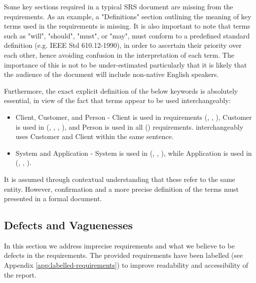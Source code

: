 Some key sections required in a typical SRS document are missing from the requirements.  As an example, a "Definitions" section outlining the meaning of key terms used in the requirements is missing.  It is also important to note that terms such as "will", "should", "must", or "may", must conform to a predefined standard definition (e.g. IEEE Std 610.12-1990), in order to ascertain their priority over each other, hence avoiding confusion in the interpretation of each term. The importance of this is not to be under-estimated particularly that it is likely that the audience of the document will include non-native English speakers.
\par
Furthermore, the exact explicit definition of the below keywords is absolutely essential, in view of the fact that terms appear to be used interchangeably:
\begin{itemize}
    \item Client, Customer, and Person - Client is used in requirements (\ROne, \RTwo, \RFive), Customer is used in (\RTwo, \RThree, \RFour, \RFive), and Person is used in all (\REight) requirements. \RFive \space interchangeably uses Customer and Client within the same sentence. 
    \item System and Application - System is used in (\RTwo, \RSix, \RSeven), while Application is used in (\ROne, \RFour, \RFive). 
\end{itemize}
It is assumed through contextual understanding that these refer to the same entity.  However, confirmation and a more precise definition of the terms must presented in a formal document.
\par


\subsection{Defects and Vaguenesses}

In this section we address imprecise requirements and what we believe to be defects in the requirements. The provided requirements have been labelled (see Appendix \ref{app:labelled-requirements}) to improve readability and accessibility of the report. 

